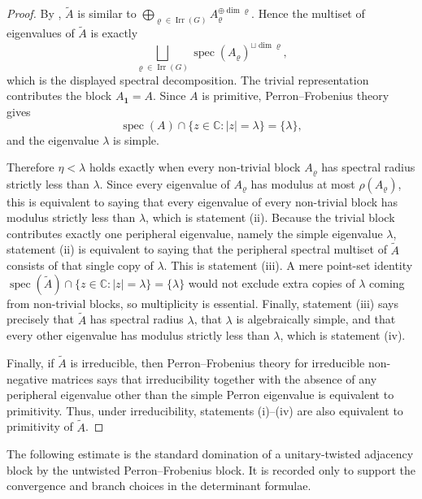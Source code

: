 \documentclass[11pt,a4paper]{amsart}
\theoremstyle{plain}
\theoremstyle{definition}
\theoremstyle{remark}
\DeclareMathOperator{\spec}{spec}
\DeclareMathOperator{\Irr}{Irr}
\newcommand{\CC}{\mathbb{C}}
\newcommand{\abs}[1]{\lvert #1 \rvert}
\begin{document}
\begin{proof}
  By
  ,
  \(\widetilde A\) is similar to
  \(\bigoplus_{\varrho\in\Irr(G)}A_\varrho^{\oplus\dim\varrho}\). Hence
  the multiset of eigenvalues of \(\widetilde A\) is exactly
  \[
    \bigsqcup_{\varrho\in\Irr(G)}
      \spec(A_\varrho)^{\sqcup \dim\varrho},
  \]
  which is the displayed spectral decomposition. The trivial
  representation contributes the block \(A_{\mathbf 1}=A\). Since \(A\)
  is primitive, Perron--Frobenius theory gives
  \[
    \spec(A)\cap\{z\in\CC:\abs{z}=\lambda\}=\{\lambda\},
  \]
  and the eigenvalue \(\lambda\) is simple.

  Therefore \(\eta<\lambda\) holds exactly when every non-trivial block
  \(A_\varrho\) has spectral radius strictly less than \(\lambda\).
  Since every eigenvalue of \(A_\varrho\) has modulus at most
  \(\rho(A_\varrho)\), this is equivalent to saying that every
  eigenvalue of every non-trivial block has modulus strictly less than
  \(\lambda\), which is statement \rm(ii). Because the trivial block
  contributes exactly one peripheral eigenvalue, namely the simple
  eigenvalue \(\lambda\), statement \rm(ii) is equivalent to saying
  that the peripheral spectral multiset of \(\widetilde A\) consists of
  that single copy of \(\lambda\). This is statement \rm(iii). A mere
  point-set identity
  \(\spec(\widetilde A)\cap\{z\in\CC:\abs{z}=\lambda\}=\{\lambda\}\)
  would not exclude extra copies of \(\lambda\) coming from
  non-trivial blocks, so multiplicity is essential. Finally,
  statement \rm(iii) says precisely that \(\widetilde A\) has spectral
  radius \(\lambda\), that \(\lambda\) is algebraically simple, and
  that every other eigenvalue has modulus strictly less than
  \(\lambda\), which is statement \rm(iv).

  Finally, if \(\widetilde A\) is irreducible, then Perron--Frobenius
  theory for irreducible non-negative matrices says that irreducibility
  together with the absence of any peripheral eigenvalue other than the
  simple Perron eigenvalue is equivalent to primitivity. Thus, under
  irreducibility, statements \rm(i)--\rm(iv) are also equivalent to
  primitivity of \(\widetilde A\).
\end{proof}

The following estimate is the standard domination of a unitary-twisted
adjacency block by the untwisted Perron--Frobenius block.  It is recorded only
to support the convergence and branch choices in the determinant formulae.
\end{document}
